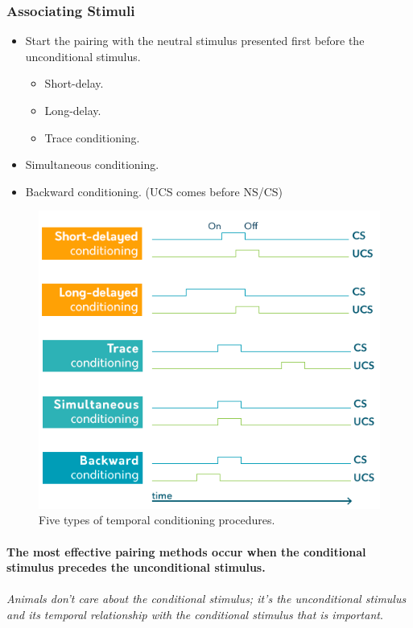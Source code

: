 \documentclass{article}
\begin{document}
	\subsubsection{Associating Stimuli}
	\begin{itemize}
		\item Start the pairing with the neutral stimulus presented first before the unconditional stimulus.
		\begin{itemize}
			\item Short-delay.
			\item Long-delay.
			\item Trace conditioning.
		\end{itemize}
		\item Simultaneous conditioning.
		\item Backward conditioning. (UCS comes before NS/CS)
	\end{itemize}
	\begin{figure}
		\centering
		\includegraphics[width = \linewidth]{pic/conditioning_methods}
		\caption{Five types of temporal conditioning procedures.}
	\end{figure}
	\paragraph{}\textbf{The most effective pairing methods occur when the conditional stimulus precedes the unconditional stimulus.}
	\paragraph{} \emph{Animals don't care about the conditional stimulus; it's the unconditional stimulus and its temporal relationship with the conditional stimulus that is important}.
\end{document}
